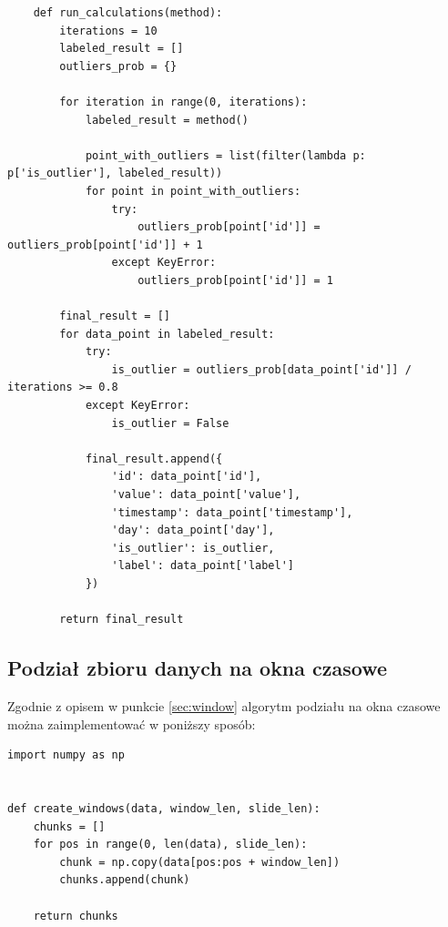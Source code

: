 \documentclass[eng,printmode]{mgr}
\begin{document}
\begin{lstlisting}
    def run_calculations(method):
        iterations = 10
        labeled_result = []
        outliers_prob = {}

        for iteration in range(0, iterations):
            labeled_result = method()

            point_with_outliers = list(filter(lambda p: p['is_outlier'], labeled_result))
            for point in point_with_outliers:
                try:
                    outliers_prob[point['id']] = outliers_prob[point['id']] + 1
                except KeyError:
                    outliers_prob[point['id']] = 1

        final_result = []
        for data_point in labeled_result:
            try:
                is_outlier = outliers_prob[data_point['id']] / iterations >= 0.8
            except KeyError:
                is_outlier = False

            final_result.append({
                'id': data_point['id'],
                'value': data_point['value'],
                'timestamp': data_point['timestamp'],
                'day': data_point['day'],
                'is_outlier': is_outlier,
                'label': data_point['label']
            })

        return final_result
\end{lstlisting}


\subsection{Podział zbioru danych na okna czasowe}
Zgodnie z opisem w punkcie \ref{sec:window} algorytm podziału na okna czasowe można zaimplementować w poniższy sposób:
\\
\begin{lstlisting}
import numpy as np


def create_windows(data, window_len, slide_len):
    chunks = []
    for pos in range(0, len(data), slide_len):
        chunk = np.copy(data[pos:pos + window_len])
        chunks.append(chunk)

    return chunks
\end{lstlisting}
\end{document}
